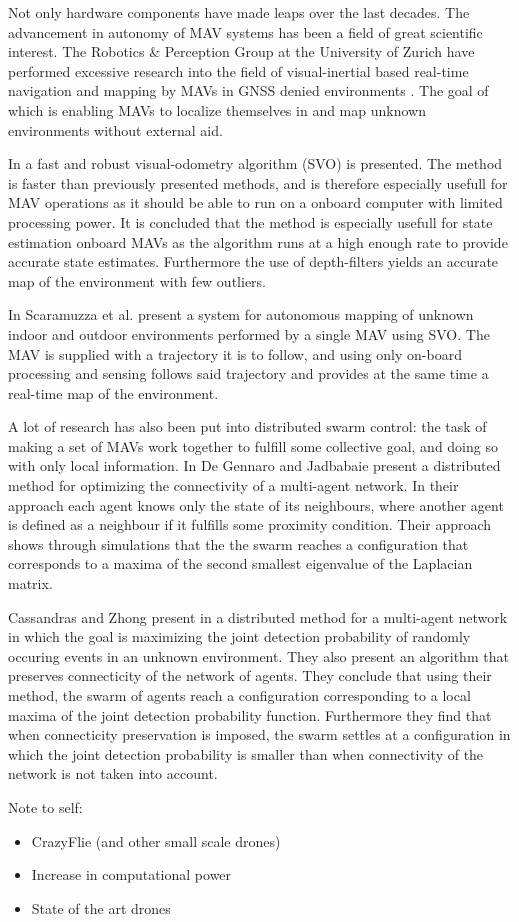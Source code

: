 Not only hardware components have made leaps over the last decades. The advancement in autonomy of MAV systems has been a field of great scientific interest.
The Robotics \& Perception Group at the University of Zurich have performed excessive research into the field of visual-inertial based real-time navigation and mapping
by MAVs in GNSS denied environments \cite{svo2, svo1}. The goal of which is enabling MAVs to localize themselves in and map unknown environments without external aid.

In \cite{svo2} a fast and robust visual-odometry algorithm (SVO) is presented. The method is faster than previously presented methods, and is therefore especially usefull 
for MAV operations as it should be able to run on a onboard computer with limited processing power. It is concluded that the method is especially usefull for state estimation onboard MAVs as the algorithm runs
at a high enough rate to provide accurate state estimates. Furthermore the use of depth-filters yields an accurate map of the environment with few outliers.

In \cite{svo1} Scaramuzza et al. present a system for autonomous mapping of unknown indoor and outdoor environments performed by a single MAV using SVO. The MAV is supplied with 
a trajectory it is to follow, and using only on-board processing and sensing follows said trajectory and provides at the same time a real-time map of the environment.

A lot of research has also been put into distributed swarm control: the task of making a set of MAVs work together to fulfill some collective goal, and doing so 
with only local information. In \cite{connectivity_subgradient} De Gennaro and Jadbabaie present a distributed method for optimizing the connectivity of a multi-agent network.
In their approach each agent knows only the state of its neighbours, where another agent is defined as a neighbour if it fulfills some proximity condition.
Their approach shows through simulations that the the swarm reaches a configuration that corresponds to a maxima of the second smallest eigenvalue of the Laplacian matrix.

Cassandras and Zhong present in \cite{cassandras} a distributed method for a multi-agent network in which the goal is maximizing the joint detection probability of randomly occuring events in an unknown environment.
They also present an algorithm that preserves connecticity of the network of agents. They conclude that using their method, the swarm of agents reach a configuration corresponding to a 
local maxima of the joint detection probability function. Furthermore they find that when connecticity preservation is imposed, the swarm settles at a configuration in which the joint detection probability is
smaller than when connectivity of the network is not taken into account.

Note to self:
\begin{itemize}
  \item CrazyFlie (and other small scale drones)
  \item Increase in computational power
  \item State of the art drones
\end{itemize}